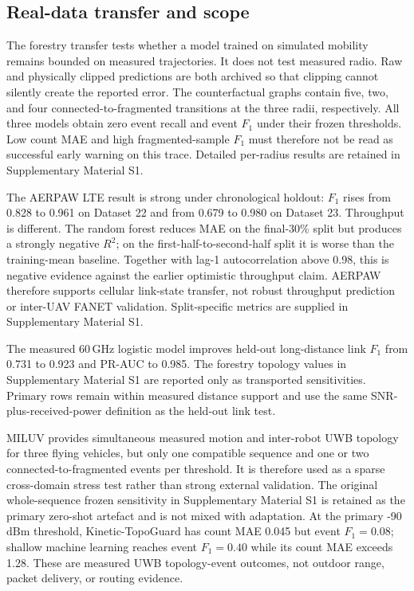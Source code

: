 \documentclass[final,5p,times,twocolumn]{elsarticle}
\newcommand{\SI}[2]{#1\,\ensuremath{\mathrm{#2}}}
\begin{document}
\subsection{Real-data transfer and scope}

The forestry transfer tests whether a model trained on simulated mobility remains bounded
on measured trajectories. It does not test measured radio. Raw and physically clipped
predictions are both archived so that clipping cannot silently create the reported error.
The counterfactual graphs contain five, two, and four connected-to-fragmented transitions
at the three radii, respectively. All three models obtain zero event recall and event
$F_1$ under their frozen thresholds. Low count MAE and high fragmented-sample $F_1$ must
therefore not be read as successful early warning on this trace. Detailed per-radius
results are retained in Supplementary Material S1.

The AERPAW LTE result is strong under chronological holdout: $F_1$ rises from 0.828 to
0.961 on Dataset 22 and from 0.679 to 0.980 on Dataset 23. Throughput is different. The
random forest reduces MAE on the final-30\% split but produces a strongly negative $R^2$;
on the first-half-to-second-half split it is worse than the training-mean baseline.
Together with lag-1 autocorrelation above 0.98, this is negative evidence against the
earlier optimistic throughput claim. AERPAW therefore supports cellular link-state
transfer, not robust throughput prediction or inter-UAV FANET validation. Split-specific
metrics are supplied in Supplementary Material S1.

The measured \SI{60}{GHz} logistic model improves held-out long-distance link $F_1$ from
0.731 to 0.923 and PR-AUC to 0.985. The forestry topology values in Supplementary Material
S1 are reported only as transported sensitivities. Primary rows remain within measured
distance support and use the same SNR-plus-received-power definition as the held-out link
test.

MILUV provides simultaneous measured motion and inter-robot UWB topology for three flying
vehicles, but only one compatible sequence and one or two connected-to-fragmented events
per threshold. It is therefore used as a sparse cross-domain stress test rather than
strong external validation. The original whole-sequence frozen sensitivity in
Supplementary Material S1 is retained as the primary zero-shot artefact and is not mixed with
adaptation. At the primary \SI{-90}{dBm} threshold, Kinetic-TopoGuard has count MAE 0.045
but event $F_1=0.08$; shallow machine learning reaches event $F_1=0.40$ while its count
MAE exceeds 1.28. These are measured UWB topology-event outcomes, not outdoor range,
packet delivery, or routing evidence.
\end{document}
